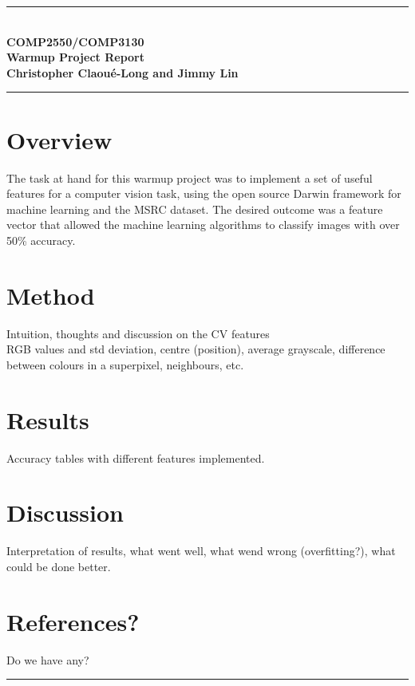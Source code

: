 \documentclass[12pt,a4paper]{article}
\newcommand{\Hrule}{\textcolor{blue}{\rule{\linewidth}{0.5mm}}}
\begin{document}
\begin{center}
\Hrule\\
\textbf{\Huge COMP2550/COMP3130\\Warmup Project Report}\\
\textbf{\large Christopher Claou\'e-Long and Jimmy Lin}\\
\Hrule
\end{center}
\begin{multicols}{2}
\section{Overview}
The task at hand for this warmup project was to implement a set of useful features for a computer vision task, using the open source Darwin framework for machine learning and the MSRC dataset.  The desired outcome was a feature vector that allowed the machine learning algorithms to classify images with over 50\% accuracy.

\section{Method}
Intuition, thoughts and discussion on the CV features\\
RGB values and std deviation, centre (position), average grayscale, difference between colours in a superpixel, neighbours, etc.

\section{Results}
Accuracy tables with different features implemented.

\section{Discussion}
Interpretation of results, what went well, what wend wrong (overfitting?), what could be done better.

\section{References?}
Do we have any?
\end{multicols}
\vfill\Hrule
\end{document}
